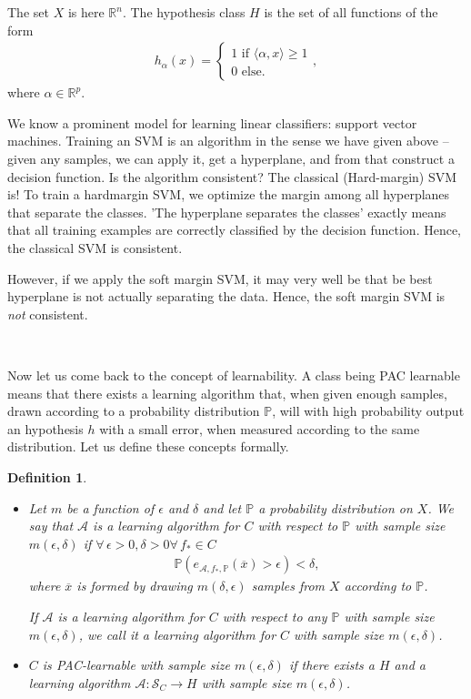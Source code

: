 \documentclass{article}
\newcommand{\calA}{\mathcal{A}}
\newcommand{\sprod}[1]{\langle #1 \rangle}
\newcommand{\calS}{\mathcal{S}}
\newcommand{\R}{\mathbb{R}}
\newtheorem{defi}{Definition}
\begin{document}
    The set $X$ is here $\R^n$. The hypothesis class $H$ is the set of all functions of the form
    \begin{align*}
        h_{\alpha}(x) = \begin{cases}
            1 \text{ if } \sprod{\alpha,x} \geq 1  \\
            0 \text{ else}.
        \end{cases},
    \end{align*}
    where $\alpha\in \R^p$.

    We know a prominent model for learning linear classifiers: support vector machines. Training an SVM is an algorithm in the sense we have given above -- given any samples, we can apply it, get a hyperplane, and from that construct a decision function. Is the algorithm consistent? The classical (Hard-margin) SVM is! To train a hardmargin SVM, we optimize the margin among all hyperplanes that separate the classes. 'The hyperplane separates the classes' exactly means that all training examples are correctly classified by the decision function. Hence, the classical SVM is consistent.

    However, if we apply the soft margin SVM, it may very well be that be best hyperplane is not actually separating the data. Hence, the soft margin SVM is \emph{not} consistent.

   
\
    



Now let us come back to the concept of learnability. A class being PAC learnable means that there exists a learning algorithm that, when given enough samples, drawn according to a probability distribution $\mathbb{P}$, will with high probability output an hypothesis $h$ with a small error, when measured according to the same distribution. Let us define these concepts formally.
\begin{defi}
    \begin{itemize}
        \item Let $m$ be a function of $\epsilon$ and $\delta$ and let $\mathbb{P}$ a probability distribution on $X$. We say that $\calA$ is a \emph{learning algorithm for $C$ with respect to $\mathbb{P}$ with sample size $m(\epsilon,\delta)$} if  $\forall \, \epsilon>0 , \delta>0 \forall \, f_* \in C$
        \begin{align*}
          \mathbb{P}( e_{\calA,f_*,\mathbb{P}}(\overline{x}) >\epsilon)<\delta,
        \end{align*}
        where $\overline{x}$ is formed by drawing $m(\delta,\epsilon)$ samples from $X$ according to $\mathbb{P}$. 

        If $\calA$ is a learning algorithm for $C$ with respect to any $\mathbb{P}$ with sample size $m(\epsilon,\delta)$, we call it a \emph{learning algorithm for $C$ with sample size $m(\epsilon,\delta)$.}
        \item $C$ is \emph{PAC-learnable} with sample size $m(\epsilon,\delta)$ if there exists a $H$ and a learning algorithm $\calA : \calS_C\to H$ with sample size $m(\epsilon,\delta)$. 
    \end{itemize}
\end{defi}
\end{document}
